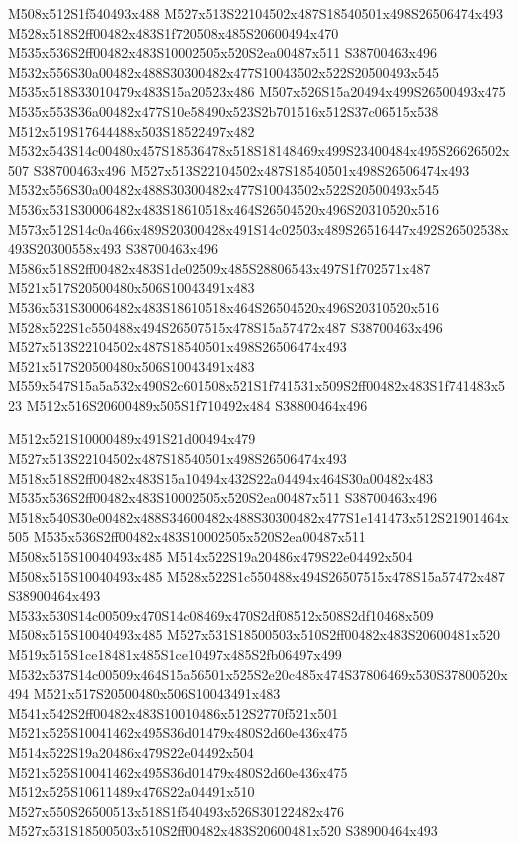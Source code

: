 \documentclass{article}
\begin{document}
\begin{multicols}{2}
M508x512S1f540493x488 M527x513S22104502x487S18540501x498S26506474x493 M528x518S2ff00482x483S1f720508x485S20600494x470 M535x536S2ff00482x483S10002505x520S2ea00487x511 S38700463x496 M532x556S30a00482x488S30300482x477S10043502x522S20500493x545 M535x518S33010479x483S15a20523x486 M507x526S15a20494x499S26500493x475 M535x553S36a00482x477S10e58490x523S2b701516x512S37c06515x538 M512x519S17644488x503S18522497x482 M532x543S14c00480x457S18536478x518S18148469x499S23400484x495S26626502x507 S38700463x496 M527x513S22104502x487S18540501x498S26506474x493 M532x556S30a00482x488S30300482x477S10043502x522S20500493x545 M536x531S30006482x483S18610518x464S26504520x496S20310520x516 M573x512S14c0a466x489S20300428x491S14c02503x489S26516447x492S26502538x493S20300558x493 S38700463x496 M586x518S2ff00482x483S1de02509x485S28806543x497S1f702571x487 M521x517S20500480x506S10043491x483 M536x531S30006482x483S18610518x464S26504520x496S20310520x516 M528x522S1c550488x494S26507515x478S15a57472x487 S38700463x496 M527x513S22104502x487S18540501x498S26506474x493 M521x517S20500480x506S10043491x483 M559x547S15a5a532x490S2c601508x521S1f741531x509S2ff00482x483S1f741483x523 M512x516S20600489x505S1f710492x484 S38800464x496

M512x521S10000489x491S21d00494x479 M527x513S22104502x487S18540501x498S26506474x493 M518x518S2ff00482x483S15a10494x432S22a04494x464S30a00482x483 M535x536S2ff00482x483S10002505x520S2ea00487x511 S38700463x496 M518x540S30e00482x488S34600482x488S30300482x477S1e141473x512S21901464x505 M535x536S2ff00482x483S10002505x520S2ea00487x511 M508x515S10040493x485 M514x522S19a20486x479S22e04492x504 M508x515S10040493x485 M528x522S1c550488x494S26507515x478S15a57472x487 S38900464x493 M533x530S14c00509x470S14c08469x470S2df08512x508S2df10468x509 M508x515S10040493x485 M527x531S18500503x510S2ff00482x483S20600481x520 M519x515S1ce18481x485S1ce10497x485S2fb06497x499 M532x537S14c00509x464S15a56501x525S2e20c485x474S37806469x530S37800520x494 M521x517S20500480x506S10043491x483 M541x542S2ff00482x483S10010486x512S2770f521x501 M521x525S10041462x495S36d01479x480S2d60e436x475 M514x522S19a20486x479S22e04492x504 M521x525S10041462x495S36d01479x480S2d60e436x475 M512x525S10611489x476S22a04491x510 M527x550S26500513x518S1f540493x526S30122482x476 M527x531S18500503x510S2ff00482x483S20600481x520 S38900464x493


\end{multicols}
\end{document}
